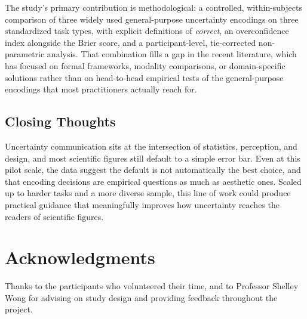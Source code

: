 \documentclass{article}
\begin{document}
The study's primary contribution is methodological: a controlled,
within-subjects comparison of three widely used general-purpose
uncertainty encodings on three standardized task types, with explicit
definitions of \emph{correct}, an overconfidence index alongside the
Brier score, and a participant-level, tie-corrected non-parametric
analysis.  That combination fills a gap in the recent literature,
which has focused on formal frameworks, modality comparisons, or
domain-specific solutions rather than on head-to-head empirical tests
of the general-purpose encodings that most practitioners actually
reach for.

\subsection*{Closing Thoughts}

Uncertainty communication sits at the intersection of statistics,
perception, and design, and most scientific figures still default to
a simple error bar.  Even at this pilot scale, the data suggest the
default is not automatically the best choice, and that encoding
decisions are empirical questions as much as aesthetic ones.  Scaled
up to harder tasks and a more diverse sample, this line of work
could produce practical guidance that meaningfully improves how
uncertainty reaches the readers of scientific figures.

\section*{Acknowledgments}

Thanks to the participants who volunteered their time, and to
Professor Shelley Wong for advising on study design and providing feedback
throughout the project.

\printbibliography
\end{document}
